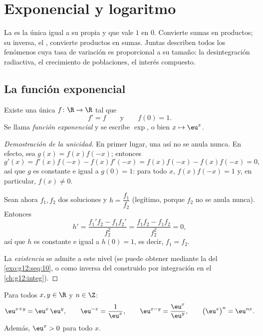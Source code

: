 \chapter{Exponencial y logaritmo}\label{ch:g12:exp}

La  es la única  igual a su propia  y que
vale $1$ en $0$. Convierte sumas en productos; su inversa, el , convierte productos en sumas. Juntas describen todos los
fenómenos cuya tasa de variación es proporcional a su tamaño: la
desintegración radiactiva, el crecimiento de poblaciones, el interés
compuesto.

\section{La función exponencial}

\begin{theorem}\label{thm:g12:exp:existence}
Existe una única   $f \colon \R \to \R$ tal que
\[
f' = f \qquad\text{y}\qquad f(0) = 1 .
\]
Se llama \emph{función exponencial} y se escribe
$\exp$, o bien $x \mapsto \eu^x$.
\end{theorem}

\begin{proof}[Demostración de la unicidad]
En primer lugar, una  así no se anula nunca. En efecto, sea
$g(x) = f(x)f(-x)$; entonces
\[
g'(x) = f'(x)f(-x) - f(x)f'(-x) = f(x)f(-x) - f(x)f(-x) = 0,
\]
así que $g$ es constante e igual a $g(0) = 1$: para todo $x$,
$f(x)f(-x) = 1$ y, en particular, $f(x) \neq 0$.

Sean ahora $f_1, f_2$ dos soluciones y $h = \dfrac{f_1}{f_2}$ (legítimo,
porque $f_2$ no se anula nunca). Entonces
\[
h' = \frac{f_1' f_2 - f_1 f_2'}{f_2^2} = \frac{f_1 f_2 - f_1 f_2}{f_2^2} = 0,
\]
así que $h$ es constante e igual a $h(0) = 1$, es decir, $f_1 = f_2$.

La \emph{existencia} se admite a este nivel (se puede obtener mediante la
 del \cref{exo:g12:seq:10}, o como inversa del 
construido por integración en el \cref{ch:g12:integ}).
\end{proof}

\begin{proposition}\label{prop:g12:exp:funceq}
Para todos $x, y \in \R$ y $n \in \Z$:
\[
\eu^{x+y} = \eu^x\,\eu^y, \qquad
\eu^{-x} = \frac{1}{\eu^x}, \qquad
\eu^{x-y} = \frac{\eu^x}{\eu^y}, \qquad
\bigl(\eu^{x}\bigr)^n = \eu^{nx}.
\]
Además, $\eu^x > 0$ para todo $x$.
\end{proposition}

